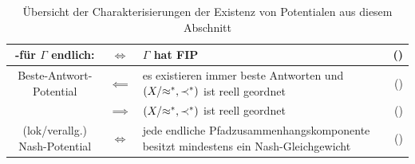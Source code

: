 \begin{table}
\begin{tabularx}{\textwidth}{ccXr}
		-für $\Gamma$ endlich:			& $\iff$	& $\Gamma$ hat FIP
		& (\Cref{kor:CharExVerOrdFIP})\\\hline
		Beste-Antwort-Potential			& $\impliedby$	& es existieren immer beste Antworten und $(X/{\approx^\ast}, \prec^\ast)$ ist reell geordnet
		& (\Cref{satz:CharExBAPot})	\\
										& $\implies$	& $(X/{\approx^\ast}, \prec^\ast)$ ist reell geordnet
		& (\Cref{satz:CharExBAPot})		\\\hline
		(lok/verallg.) Nash-Potential	& $\iff$	& jede endliche Pfadzusammenhangskomponente besitzt mindestens ein Nash-Gleichgewicht
		& (\Cref{satz:CharExNashPot})
	\end{tabularx}	
	\caption{Übersicht der Charakterisierungen der Existenz von Potentialen aus diesem Abschnitt}\label{tab:PotCharakterisierung}
\end{table}

